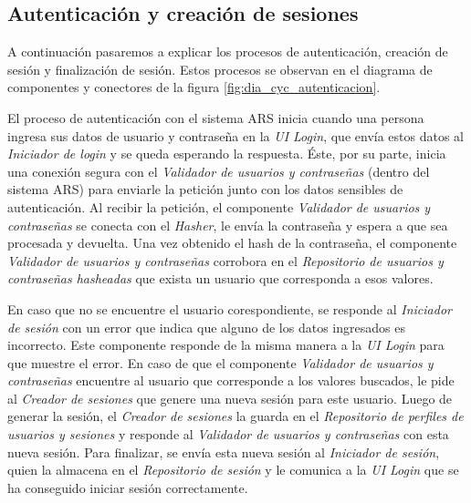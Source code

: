 \subsection{Autenticación y creación de sesiones}

\par A continuación pasaremos a explicar los procesos de autenticación, creación de sesión y finalización de sesión. Estos procesos se observan en el diagrama de componentes y conectores de la figura \ref{fig:dia_cyc_autenticacion}.\\

\par El proceso de autenticación con el sistema ARS inicia cuando una persona ingresa sus datos de usuario y contraseña en la \textit{UI Login}, que envía estos datos al \textit{Iniciador de login} y se queda esperando la respuesta. Éste, por su parte, inicia una conexión segura con el \textit{Validador de usuarios y contraseñas} (dentro del sistema ARS) para enviarle la petición junto con los datos sensibles de autenticación. Al recibir la petición, el componente \textit{Validador de usuarios y contraseñas} se conecta con el \textit{Hasher}, le envía la contraseña y espera a que sea procesada y devuelta. Una vez obtenido el hash de la contraseña, el componente \textit{Validador de usuarios y contraseñas} corrobora en el \textit{Repositorio de usuarios y contraseñas hasheadas} que exista un usuario que corresponda a esos valores. \\

\par En caso que no se encuentre el usuario corespondiente, se responde al \textit{Iniciador de sesión} con un error que indica que alguno de los datos ingresados es incorrecto. Este componente responde de la misma manera a la \textit{UI Login} para que muestre el error. En caso de que el componente \textit{Validador de usuarios y contraseñas} encuentre al usuario que corresponde a los valores buscados, le pide al \textit{Creador de sesiones} que genere una nueva sesión para este usuario. Luego de generar la sesión, el \textit{Creador de sesiones} la guarda en el \textit{Repositorio de perfiles de usuarios y sesiones} y responde al \textit{Validador de usuarios y contraseñas} con esta nueva sesión. Para finalizar, se envía esta nueva sesión al \textit{Iniciador de sesión}, quien la almacena en el \textit{Repositorio de sesión} y le comunica a la \textit{UI Login} que se ha conseguido iniciar sesión correctamente.\\

